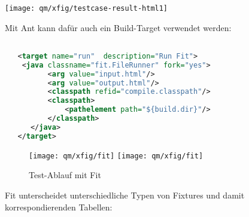 \begin{center}
\texttt{[image: qm/xfig/testcase-result-html1]}
\end{center}
\newslide
Mit Ant kann dafür auch ein Build-Target verwendet werden:
\begin{lstlisting}[language=xml,morekeywords={target,java,arg,classpath}]

   <target name="run"  description="Run Fit">
    <java classname="fit.FileRunner" fork="yes">
          <arg value="input.html"/>
          <arg value="output.html"/>
          <classpath refid="compile.classpath"/>
          <classpath>
              <pathelement path="${build.dir}"/>
          </classpath>
      </java>
   </target>

\end{lstlisting}
\newslide
\begin{figure}[H]
  \centering
\ifslides
  \texttt{[image: qm/xfig/fit]}
\else
  \texttt{[image: qm/xfig/fit]}
\fi
  \caption{Test-Ablauf mit Fit}
  \label{fig:fit-test-procedure}
\end{figure}
\newslide
Fit unterscheidet unterschiedliche Typen von Fixtures und damit
korrespondierenden Tabellen:
